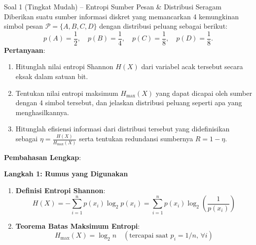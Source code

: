 \documentclass[11pt,a4paper]{article}
\begin{document}
\begin{soalmudah}{Soal 1 (Tingkat Mudah) -- Entropi Sumber Pesan \& Distribusi Seragam}
Diberikan suatu sumber informasi diskret yang memancarkan 4 kemungkinan simbol pesan $\mathcal{P} = \{A, B, C, D\}$ dengan distribusi peluang sebagai berikut:
\[
p(A) = \frac{1}{2}, \quad p(B) = \frac{1}{4}, \quad p(C) = \frac{1}{8}, \quad p(D) = \frac{1}{8}.
\]
\textbf{Pertanyaan}:
\begin{enumerate}[label=\alph*)]
    \item Hitunglah nilai entropi Shannon $H(X)$ dari variabel acak tersebut secara eksak dalam satuan bit.
    \item Tentukan nilai entropi maksimum $H_{\max}(X)$ yang dapat dicapai oleh sumber dengan 4 simbol tersebut, dan jelaskan distribusi peluang seperti apa yang menghasilkannya.
    \item Hitunglah efisiensi informasi dari distribusi tersebut yang didefinisikan sebagai $\eta = \frac{H(X)}{H_{\max}(X)}$ serta tentukan redundansi sumbernya $R = 1 - \eta$.
\end{enumerate}
\end{soalmudah}

\noindent\textbf{Pembahasan Lengkap}:

\noindent\textbf{Langkah 1: Rumus yang Digunakan}
\begin{enumerate}
    \item \textbf{Definisi Entropi Shannon}:
    \begin{equation}
    \label{eq:ent_def1}
    H(X) = - \sum_{i=1}^n p(x_i) \log_2 p(x_i) = \sum_{i=1}^n p(x_i) \log_2\left(\frac{1}{p(x_i)}\right)
    \end{equation}
    \item \textbf{Teorema Batas Maksimum Entropi}:
    \begin{equation}
    \label{eq:ent_max1}
    H_{\max}(X) = \log_2 n \quad (\text{tercapai saat } p_i = 1/n, \, \forall i)
    \end{equation}
\end{enumerate}
\end{document}
